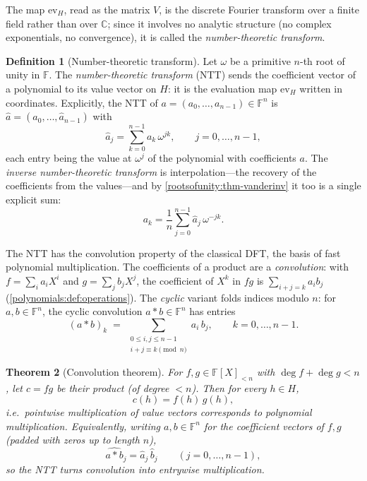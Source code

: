 \documentclass[11pt,a4paper]{article}
\newtheorem{theorem}{Theorem}[section]
\theoremstyle{definition}
\newtheorem{definition}[theorem]{Definition}
\theoremstyle{remark}
\providecommand{\C}{}\renewcommand{\C}{\ensuremath{\mathbb{C}}}
\newcommand{\F}{\ensuremath{\mathbb{F}}}
\begin{document}
The map \(\mathrm{ev}_H\), read as the matrix \(V\), is the discrete
Fourier transform over a finite field rather than over \(\C\); since it
involves no analytic structure (no complex exponentials, no
convergence), it is called the \emph{number-theoretic transform}.

\begin{definition}[Number-theoretic transform]\label{rootsofunity:def-ntt}
Let \(\omega\) be a primitive \(n\)-th root of unity in \(\F\). The
\emph{number-theoretic transform} (NTT) sends the coefficient vector
of a polynomial to its value vector on \(H\): it is the evaluation map
\(\mathrm{ev}_H\) written in coordinates. Explicitly, the NTT of
\(a = (a_0, \dots, a_{n-1}) \in \F^n\) is
\(\hat{a} = (\hat{a}_0, \dots, \hat{a}_{n-1})\) with
\[
\hat{a}_j = \sum_{k=0}^{n-1} a_k\, \omega^{jk},
\qquad j = 0, \dots, n-1,
\]
each entry being the value at \(\omega^j\) of the polynomial with
coefficients \(a\). The \emph{inverse number-theoretic transform} is
interpolation---the recovery of the coefficients from the values---and
by \cref{rootsofunity:thm-vanderinv} it too is a single explicit sum:
\[
a_k = \frac{1}{n} \sum_{j=0}^{n-1} \hat{a}_j\, \omega^{-jk}.
\]
\end{definition}

The NTT has the convolution property of the classical DFT, the basis of
fast polynomial multiplication. The coefficients of a product are a
\emph{convolution}: with
\(f = \sum_i a_i X^i\) and \(g = \sum_j b_j X^j\), the coefficient of
\(X^k\) in \(fg\) is \(\sum_{i+j=k} a_i b_j\)
(\cref{polynomials:def:operations}). The \emph{cyclic} variant folds
indices modulo \(n\): for \(a, b \in \F^n\), the cyclic convolution
\(a * b \in \F^n\) has entries
\[
(a * b)_k \;=\; \sum_{\substack{0 \le i, j \le n-1\\
i + j \equiv k \pmod{n}}} a_i\, b_j,
\qquad k = 0, \dots, n-1.
\]

\begin{theorem}[Convolution theorem]\label{rootsofunity:thm-convolution}
For \(f, g \in \F[X]_{<n}\) with \(\deg f + \deg g < n\), let \(c = fg\) be
their product (of degree \(< n\)). Then for every \(h \in H\),
\[
c(h) = f(h)\, g(h),
\]
i.e.\ pointwise multiplication of value vectors corresponds to
polynomial multiplication. Equivalently, writing \(a, b \in \F^n\) for
the coefficient vectors of \(f, g\) (padded with zeros up to length
\(n\)),
\[
\widehat{a * b}_j = \hat{a}_j\, \hat{b}_j
\qquad (j = 0, \dots, n-1),
\]
so the NTT turns convolution into entrywise multiplication.
\end{theorem}
\end{document}
